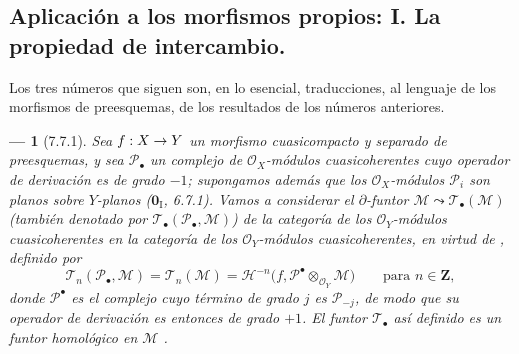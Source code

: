 \documentclass[10pt,oneside,openany]{book}
\theoremstyle{egaenv}\newtheorem*{env}{---}
\theoremstyle{egastatement}
\theoremstyle{egadescription}
\newcommand{\oldpage}[2][]{\marginnote{\normalfont\scriptsize\textbf{#1}\,|\,#2}\ignorespaces}
\renewcommand{\to}{\mathchoice{\longrightarrow}{\rightarrow}{\rightarrow}{\rightarrow}}
\begin{document}
\subsection{Aplicación a los morfismos propios: I. La propiedad de intercambio.}
\label{subsection:III.7.7.fr}

Los tres números que siguen son, en lo esencial, traducciones, al
lenguaje de los morfismos de preesquemas, de los resultados de los números anteriores.

\begin{env}[7.7.1]
\label{III.7.7.1}
Sea $f:X\to Y$ un morfismo cuasicompacto y separado de preesquemas, y sea
$\mathscr P_\bullet$ un complejo de $\mathscr O_X$-módulos cuasicoherentes cuyo
operador de derivación es de grado $-1$; supongamos además que los
$\mathscr O_X$-módulos $\mathscr P_i$ son \emph{planos} sobre $Y$-\emph{planos} ($\mathbf{0}_{\mathrm I}$, 6.7.1).
\oldpage[III]{198}
Vamos a considerar el $\partial$-funtor
$\mathscr M\leadsto\mathscr T_\bullet(\mathscr M)$ (también denotado por
$\mathscr T_\bullet(\mathscr P_\bullet,\mathscr M)$) de la categoría de los
$\mathscr O_Y$-módulos cuasicoherentes en la categoría de los
$\mathscr O_Y$-módulos cuasicoherentes, en virtud de , definido
por
\[
  \mathscr T_n(\mathscr P_\bullet,\mathscr M)
  =\mathscr T_n(\mathscr M)
  =\mathscr H^{-n}
    \bigl(f,\mathscr P^\bullet\otimes_{\mathscr O_Y}\mathscr M\bigr)
  \qquad\text{para }n\in\mathbf Z,
  \tag{7.7.1.1}\label{III.7.7.1.1.fr}
\]
donde $\mathscr P^\bullet$ es el complejo cuyo término de grado $j$ es
$\mathscr P_{-j}$, de modo que su operador de derivación es entonces de grado
$+1$. El funtor $\mathscr T_\bullet$ así definido es un \emph{funtor
homológico} en $\mathscr M$ .
\end{env}
\end{document}

